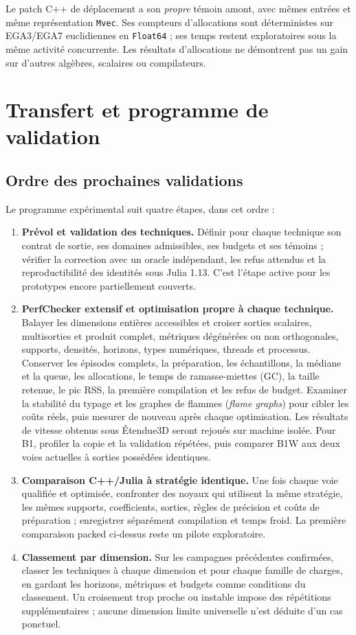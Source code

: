 \documentclass[11pt,a4paper]{article}
\newcommand{\code}[1]{\texttt{#1}}
\begin{document}
Le patch C++ de déplacement a son \emph{propre} témoin amont, avec mêmes
entrées et même représentation \code{Mvec}. Ses compteurs d'allocations
sont déterministes sur EGA3/EGA7 euclidiennes en \code{Float64} ; ses temps
restent exploratoires sous la même activité concurrente. Les résultats
d'allocations ne démontrent pas un gain sur d'autres algèbres, scalaires
ou compilateurs.

\section{Transfert et programme de validation}
\subsection{Ordre des prochaines validations}
Le programme expérimental suit quatre étapes, dans cet ordre :
\begin{enumerate}
\item \textbf{Prévol et validation des techniques.} Définir pour chaque
technique son contrat de sortie, ses domaines admissibles, ses budgets et
ses témoins ; vérifier la correction avec un oracle indépendant, les
refus attendus et la reproductibilité des identités sous Julia 1.13.
C'est l'étape active pour les prototypes encore partiellement couverts.
\item \textbf{PerfChecker extensif et optimisation propre à chaque
technique.} Balayer les dimensions entières accessibles et croiser
sorties scalaires, multisorties et produit complet, métriques dégénérées
ou non orthogonales, supports, densités, horizons, types numériques,
threads et processus. Conserver les épisodes complets, la préparation,
les échantillons, la médiane et la queue, les allocations, le temps de
ramasse-miettes (GC), la taille retenue, le pic RSS, la première
compilation et les refus de budget. Examiner la stabilité du typage et
les graphes de flammes (\emph{flame graphs}) pour cibler les coûts réels,
puis mesurer de nouveau après chaque optimisation. Les résultats de
vitesse obtenus sous Étendue3D seront rejoués sur machine isolée.
Pour B1, profiler la copie et la validation répétées, puis comparer
B1W aux deux voies actuelles à sorties possédées identiques.
\item \textbf{Comparaison C++/Julia à stratégie identique.} Une fois
chaque voie qualifiée et optimisée, confronter des noyaux qui utilisent
la même stratégie, les mêmes supports, coefficients, sorties, règles
de précision et coûts de préparation ; enregistrer séparément
compilation et temps froid. La première comparaison packed ci-dessus
reste un pilote exploratoire.
\item \textbf{Classement par dimension.} Sur les campagnes précédentes
confirmées, classer les techniques à chaque dimension et pour chaque
famille de charges, en gardant les horizons, métriques et budgets comme
conditions du classement. Un croisement trop proche ou instable impose
des répétitions supplémentaires ; aucune dimension limite universelle
n'est déduite d'un cas ponctuel.
\end{enumerate}
\end{document}
